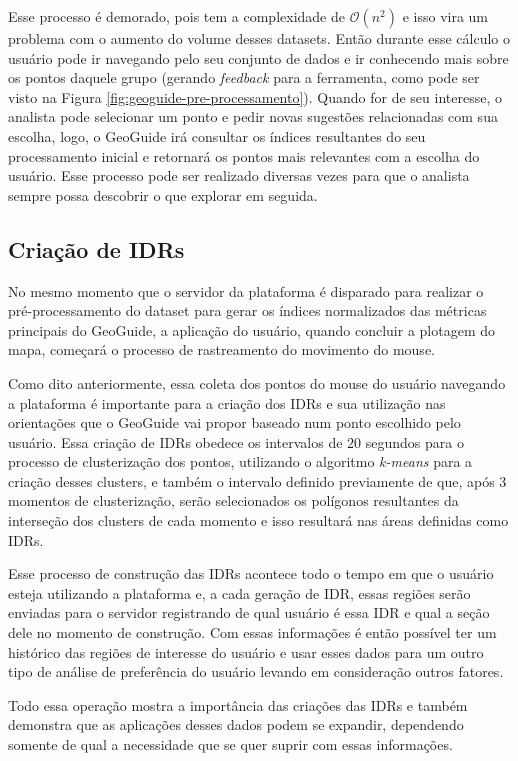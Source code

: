 Esse processo é demorado, pois tem a complexidade de $\mathcal{O}(n^{2})$ e isso vira um problema com o aumento do volume desses datasets. Então durante esse cálculo o usuário pode ir navegando pelo seu conjunto de dados e ir conhecendo mais sobre os pontos daquele grupo (gerando \textit{feedback} para a ferramenta, como pode ser visto na Figura \ref{fig:geoguide-pre-processamento}). Quando for de seu interesse, o analista pode selecionar um ponto e pedir novas sugestões relacionadas com sua escolha, logo, o GeoGuide irá consultar os índices resultantes do seu processamento inicial e retornará os pontos mais relevantes com a escolha do usuário. Esse processo pode ser realizado diversas vezes para que o analista sempre possa descobrir o que explorar em seguida.

\subsection{Criação de IDRs}

No mesmo momento que o servidor da plataforma é disparado para realizar o pré-processamento do dataset para gerar os índices normalizados das métricas principais do GeoGuide, a aplicação do usuário, quando concluir a plotagem do mapa, começará o processo de rastreamento do movimento do mouse.

Como dito anteriormente, essa coleta dos pontos do mouse do usuário navegando a plataforma é importante para a criação dos IDRs e sua utilização nas orientações que o GeoGuide vai propor baseado num ponto escolhido pelo usuário. Essa criação de IDRs obedece os intervalos de $20$ segundos para o processo de clusterização dos pontos, utilizando o algoritmo \textit{k-means} para a criação desses clusters, e também o intervalo definido previamente de que, após $3$ momentos de clusterização, serão selecionados os polígonos resultantes da interseção dos clusters de cada momento e isso resultará nas áreas definidas como IDRs.

Esse processo de construção das IDRs acontece todo o tempo em que o usuário esteja utilizando a plataforma e, a cada geração de IDR, essas regiões serão enviadas para o servidor registrando de qual usuário é essa IDR e qual a seção dele no momento de construção. Com essas informações é então possível ter um histórico das regiões de interesse do usuário e usar esses dados para um outro tipo de análise de preferência do usuário levando em consideração outros fatores.

Todo essa operação mostra a importância das criações das IDRs e também demonstra que as aplicações desses dados podem se expandir, dependendo somente de qual a necessidade que se quer suprir com essas informações.

